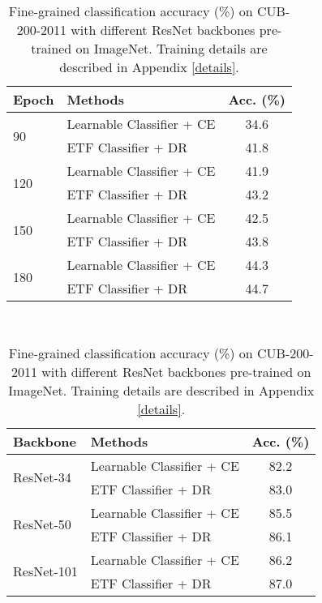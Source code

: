 \documentclass{article}
\newcommand{\<}{\left\langle}
\renewcommand{\>}{\right\rangle}
\begin{document}
\begin{table}
	\small
	\vspace{-1mm}
	\begin{minipage}[th!]{\textwidth}
\begin{minipage}[t]{0.48\textwidth}
			\renewcommand\arraystretch{0.8}
			\setlength{\tabcolsep}{3.0pt}
			\centering
\caption{Long-tailed classification accuracy (\%) on ImageNet-LT \cite{liu2019large} with ResNet-50 backbone and different training epochs.}
			\begin{tabular}{l|l|c}
	\toprule
	Epoch & {Methods} & Acc. (\%)\\
	\midrule
\multirow{2}{*}{90} & Learnable Classifier + CE   &  34.6\\
	& ETF Classifier +  DR  & 41.8\\
\midrule
\multirow{2}{*}{120} & Learnable Classifier + CE    &  41.9\\
	& ETF Classifier +  DR    & 43.2 \\				
\midrule
\multirow{2}{*}{150} & Learnable Classifier + CE    &  42.5\\
	& ETF Classifier +  DR    & 43.8 \\				
	\midrule
		\multirow{2}{*}{180} & Learnable Classifier + CE    &  44.3\\
	& ETF Classifier +  DR    & 44.7\\		
\bottomrule
\end{tabular}
\vspace{2mm}
			\label{imgnet}
		\end{minipage}
		\quad \
		\begin{minipage}[t]{0.47\textwidth}
						\renewcommand\arraystretch{0.8}
			\setlength{\tabcolsep}{3.0pt}
\centering
\caption{Fine-grained classification accuracy (\%) on CUB-200-2011 \cite{wah2011caltech} with different ResNet backbones pre-trained on ImageNet. Training details are described in Appendix \ref{details}.}
			\begin{tabular}{l|l|c}
	\toprule
	Backbone & {Methods} & Acc. (\%)\\
	\midrule
\multirow{2}{*}{ResNet-34} & Learnable Classifier + CE   &  82.2\\
	& ETF Classifier +  DR  & 83.0 \\
\midrule
\multirow{2}{*}{ResNet-50} & Learnable Classifier + CE    &  85.5\\
	& ETF Classifier +  DR    & 86.1 \\				
\midrule
\multirow{2}{*}{ResNet-101} & Learnable Classifier + CE    &  86.2\\
	& ETF Classifier +  DR    & 87.0 \\				
\bottomrule
\end{tabular}
\vspace{2.5mm}
	\label{finegrain}
		\end{minipage}
	\end{minipage}
	\vspace{-6mm}
\end{table}
\end{document}
